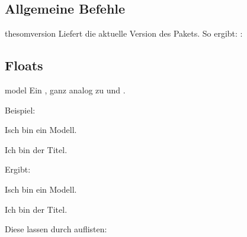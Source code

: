 \documentclass{sopra-base}
\begin{document}
\subsection{Allgemeine Befehle}

\begin{command}{thesomversion}{}
    Liefert die aktuelle Version des Pakets. So ergibt: : \thesomversion\\
\end{command}

\subsection{Floats}

\begin{environment}{model}{}
    Ein , ganz analog zu  und .
\end{environment}

Beispiel:
\begin{plainlatex}[morekeywords={[3]{model}}]
\begin{model}
    \centering
    Isch bin ein Modell.
    \caption[Und ich eigentlich kürzer.]{Ich bin der Titel.}
\end{model}
\end{plainlatex}
Ergibt:
\begin{model}
    \centering
    Isch bin ein Modell.
    \caption[Und ich eigentlich kürzer.]{Ich bin der Titel.}
\end{model}

Diese lassen durch  auflisten:

\listofmodel
\end{document}
